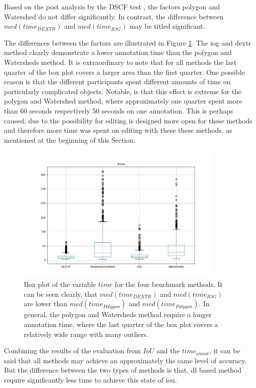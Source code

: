 Based on the post analysis by the DSCF test \cite{CF91-dscf}, the factors polygon and Watershed do not differ significantly.
In contrast, the difference between $med \left( time_{DEXTR} \right)$ and $med \left( time_{IOG} \right)$ may be titled significant.

The differences between the factors are illustrated in Figure \ref{fig:ch5:sec1:time_box_plot}.
The \gls{iog} and \gls{dextr} method clearly demonstrate a lower annotation time than the polygon and Watersheds method.
It is extraordinary to note that for all methods the last quarter of the box plot covers a larger area than the first quarter.
One possible reason is that the different participants spent different amounts of time on particularly complicated objects.
Notable, is that this effect is extreme for the polygon and Watershed method, where approximately one quarter spent more than 60 seconds respectively 50 seconds on one annotation. 
This is perhaps caused, due to the possibility for editing is designed more open for these methods and therefore more time was spent on editing with these these methods, as mentioned at the beginning of this Section.

\begin{figure}
	\centering
	\includegraphics[width=0.9\textwidth]{figures/chap51_time_boxplot.png}
	\caption[Box plot IoU per method]{
		Box plot of the variable $time$ for the four benchmark methods.
		It can be seen clearly, that $med \left( time_{DEXTR} \right)$ and $med \left( time_{IOG} \right)$ are lower than $med \left( time_{Polygon} \right)$ and $med \left( time_{Polygon} \right)$.
		In general, the polygon and Watersheds method require a longer annotation time, where the last quarter of the box plot covers a relatively wide range with many outliers. 
	} \label{fig:ch5:sec1:time_box_plot}
\end{figure}



Combining the results of the evaluation from $ IoU $ and the $ time_{annot} $, it can be said that all methods may achieve an approximately the same level of accuracy.
But the difference between the two types of methods is that, \gls{dl} based method require significantly less time to achieve this state of \gls{iou}.




